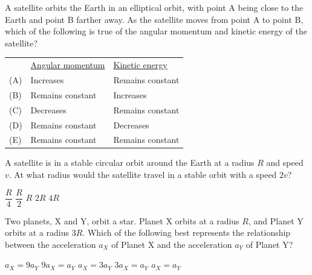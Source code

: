 \documentclass{../../../oss-apphys-exam}
\begin{document}
\begin{questions}
  \question A satellite orbits the Earth in an elliptical orbit, with point A
  being close to the Earth and point B farther away. As the satellite moves
  from point A to point B, which of the following is true of the angular
  momentum and kinetic energy of the satellite?
  \begin{center}
    \vspace{-.1in}
  \end{center}
  \begin{tabular}{lll}
    & \underline{Angular momentum} & \underline{Kinetic energy}\\
    (A) & Increases        & Remains constant \\
    (B) & Remains constant & Increases \\
    (C) & Decreases        & Remains constant \\
    (D) & Remains constant & Decreases \\
    (E) & Remains constant & Remains constant
  \end{tabular}
    
  \question A satellite is in a stable circular orbit around the Earth at a
  radius $R$ and speed $v$. At what radius would the satellite travel in
  a stable orbit with a speed $2v$?
  \begin{choices}
    \choice $\dfrac R4$
    \choice $\dfrac R2$
    \choice $R$
    \choice $2R$
    \choice $4R$
  \end{choices}
  \newpage
  
  \question Two planets, X and Y, orbit a star. Planet X orbits at a radius
  $R$, and Planet Y orbits at a radius $3R$. Which of the following best
  represents the relationship between the acceleration $a_X$ of Planet X and
  the acceleration $a_Y$ of Planet Y?
  \begin{center}
  \end{center}
  \begin{choices}
    \choice $a_X = 9a_Y$
    \choice $9a_X = a_Y$
    \choice $a_X = 3a_Y$
    \choice $3a_X = a_Y$
    \choice $a_X = a_Y$
  \end{choices}
    

\end{questions}
\end{document}
